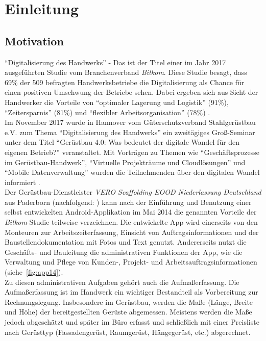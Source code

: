 \chapter{Einleitung}
\section{Motivation}\label{subsec:motivation}
``Digitalisierung des Handwerks'' - Das ist der Titel einer im Jahr 2017 ausgeführten Studie vom Branchenverband \textit{Bitkom}. 
Diese Studie besagt, dass 69\% der 509 befragten Handwerksbetriebe die Digitalisierung als Chance für einen positiven Umschwung der Betriebe sehen. 
Dabei ergeben sich aus Sicht der Handwerker die Vorteile von ``optimaler Lagerung und Logistik'' (91\%), ``Zeitersparnis'' (81\%) und ``flexibler Arbeitsorganisation'' (78\%) \citep{Bitkom17}. \\

Im November 2017 wurde in Hannover vom Güterschutzverband Stahlgerüstbau e.V. zum Thema ``Digitalisierung des Handwerks'' ein zweitägiges Groß-Seminar unter dem Titel ``Gerüstbau 4.0: Was bedeutet der digitale Wandel für den eigenen Betrieb?'' veranstaltet. 
Mit Vorträgen zu Themen wie ``Geschäftsprozesse im Gerüstbau-Handwerk'', ``Virtuelle Projekträume und Cloudlösungen'' und ``Mobile Datenverwaltung'' wurden die Teilnehmenden über den digitalen Wandel informiert \citep{GSV17}. \\

Der Gerüstbau-Dienstleister \emph{VERO Scaffolding EOOD Niederlassung Deutschland} aus Paderborn (nachfolgend: \vr{}) kann nach der Einführung und Benutzung einer selbst entwickelten Android-Applikation im Mai 2014 die genannten Vorteile der \textit{Bitkom}-Studie teilweise verzeichnen.
Die entwickelte App wird einerseits von den Monteuren zur Arbeitszeiterfassung, Einsicht von Auftragsinformationen und der Baustellendokumentation mit Fotos und Text genutzt.
Andererseits nutzt die Geschäfts- und Bauleitung die administrativen Funktionen der App, wie die Verwaltung und Pflege von Kunden-, Projekt- und Arbeitsauftragsinformationen (siehe~\autoref{fig:app14}). \\

Zu diesen administrativen Aufgaben gehört auch die Aufmaßerfassung.
Die Aufmaßerfassung ist im Handwerk ein wichtiger Bestandteil als Vorbereitung zur Rechnungslegung.
Insbesondere im Gerüstbau, werden die Maße (Länge, Breite und Höhe) der bereitgestellten Gerüste abgemessen.
Meistens werden die Maße jedoch abgeschätzt und später im Büro erfasst und schließlich mit einer Preisliste nach Gerüsttyp (Fassadengerüst, Raumgerüst, Hängegerüst, etc.) abgerechnet.

